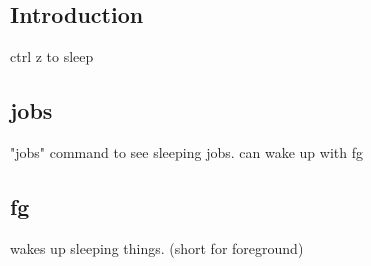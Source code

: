 
\subsection{Introduction}

ctrl z to sleep

\subsection{jobs}
"jobs" command to see sleeping jobs. can wake up with fg

\subsection{fg}

wakes up sleeping things. (short for foreground)

